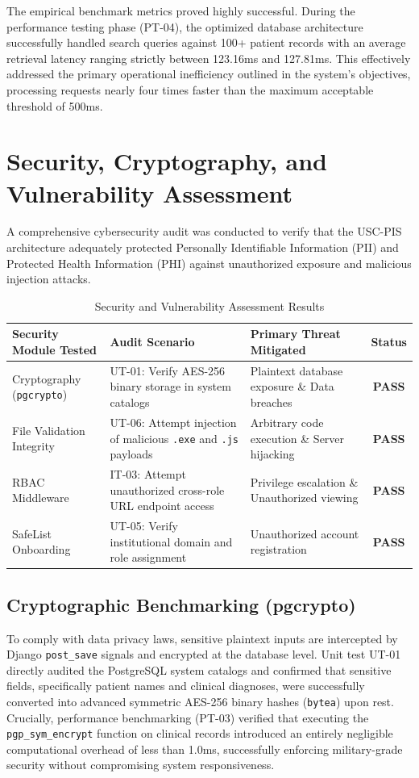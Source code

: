 The empirical benchmark metrics proved highly successful. During the performance testing phase (PT-04), the optimized database architecture successfully handled search queries against 100+ patient records with an average retrieval latency ranging strictly between 123.16ms and 127.81ms. This effectively addressed the primary operational inefficiency outlined in the system's objectives, processing requests nearly four times faster than the maximum acceptable threshold of 500ms.

\section{Security, Cryptography, and Vulnerability Assessment}
A comprehensive cybersecurity audit was conducted to verify that the USC-PIS architecture adequately protected Personally Identifiable Information (PII) and Protected Health Information (PHI) against unauthorized exposure and malicious injection attacks.

\begin{table}[htbp]
\centering
\caption{Security and Vulnerability Assessment Results}
\label{tab:security_assessment}
\begin{tabularx}{\textwidth}{|Y|Y|Y|c|}
\hline
\textbf{Security Module Tested} & \textbf{Audit Scenario} & \textbf{Primary Threat Mitigated} & \textbf{Status} \\
\hline
Cryptography (\texttt{pgcrypto}) & UT-01: Verify AES-256 binary storage in system catalogs & Plaintext database exposure \& Data breaches & \textbf{PASS} \\
\hline
File Validation Integrity & UT-06: Attempt injection of malicious \texttt{.exe} and \texttt{.js} payloads & Arbitrary code execution \& Server hijacking & \textbf{PASS} \\
\hline
RBAC Middleware & IT-03: Attempt unauthorized cross-role URL endpoint access & Privilege escalation \& Unauthorized viewing & \textbf{PASS} \\
\hline
SafeList Onboarding & UT-05: Verify institutional domain and role assignment & Unauthorized account registration & \textbf{PASS} \\
\hline
\end{tabularx}
\end{table}

\subsection{Cryptographic Benchmarking (pgcrypto)}
To comply with data privacy laws, sensitive plaintext inputs are intercepted by Django \texttt{post\_save} signals and encrypted at the database level. Unit test UT-01 directly audited the PostgreSQL system catalogs and confirmed that sensitive fields, specifically patient names and clinical diagnoses, were successfully converted into advanced symmetric AES-256 binary hashes (\texttt{bytea}) upon rest. Crucially, performance benchmarking (PT-03) verified that executing the \texttt{pgp\_sym\_encrypt} function on clinical records introduced an entirely negligible computational overhead of less than 1.0ms, successfully enforcing military-grade security without compromising system responsiveness.

